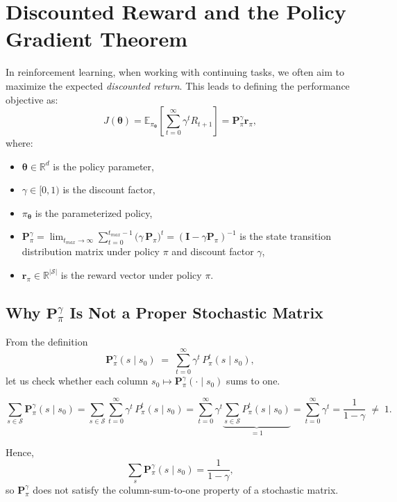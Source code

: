 \section{Discounted Reward and the Policy Gradient Theorem}

In reinforcement learning, when working with continuing tasks, we often aim to maximize the expected \emph{discounted return}. This leads to defining the performance objective as:
\[
J(\boldsymbol{\theta}) = \mathbb{E}_{\pi_{\boldsymbol{\theta}}} \left[ \sum_{t=0}^{\infty} \gamma^t R_{t+1} \right] = \mathbf{P}_\pi^{\gamma} \mathbf{r}_\pi,
\]
where:
\begin{itemize}
  \item \( \boldsymbol{\theta} \in \mathbb{R}^d \) is the policy parameter,
  \item \( \gamma \in [0,1) \) is the discount factor,
  \item \( \pi_{\boldsymbol{\theta}} \) is the parameterized policy,
  \item \( \mathbf{P}_\pi^{\gamma} = \lim_{t_{max} \to \infty}\sum_{t=0}^{t_{max}-1} \bigl(\gamma\,\mathbf{P}_\pi\bigr)^t = (\mathbf{I} - \gamma \mathbf{P}_\pi)^{-1} \) is the state transition distribution matrix under policy $\pi$ and discount factor $\gamma$,
  \item \( \mathbf{r}_\pi \in \mathbb{R}^{|\mathcal{S}|} \) is the reward vector under policy \( \pi \).
\end{itemize}

\subsection{Why \(\mathbf{P}_\pi^{\gamma}\) Is Not a Proper Stochastic Matrix}

From the definition
\[
\mathbf{P}_\pi^{\gamma}(s \mid s_{0})
\;=\;
\sum_{t=0}^{\infty} \gamma^{t}\,P_{\pi}^{t}(s\mid s_{0}),
\]
let us check whether each column \(s_{0}\mapsto \mathbf{P}_\pi^{\gamma}(\cdot\mid s_{0})\) sums to one.

\[
\sum_{s\in\mathcal{S}}
\mathbf{P}_\pi^{\gamma}(s \mid s_{0})
=
\sum_{s\in\mathcal{S}}
\sum_{t=0}^{\infty}
\gamma^{t}\,P_{\pi}^{t}(s\mid s_{0})
=
\sum_{t=0}^{\infty}
\gamma^{t}
\underbrace{\sum_{s\in\mathcal{S}}P_{\pi}^{t}(s\mid s_{0})}_{=1}
=
\sum_{t=0}^{\infty}\gamma^{t}
=
\frac{1}{1-\gamma}
\;\neq\;1.
\]

Hence,
\[
\sum_{s}\mathbf{P}_\pi^{\gamma}(s\mid s_{0})
=\frac{1}{1-\gamma},
\]
so \(\mathbf{P}_\pi^{\gamma}\) does not satisfy the column-sum-to-one property of a stochastic matrix.

